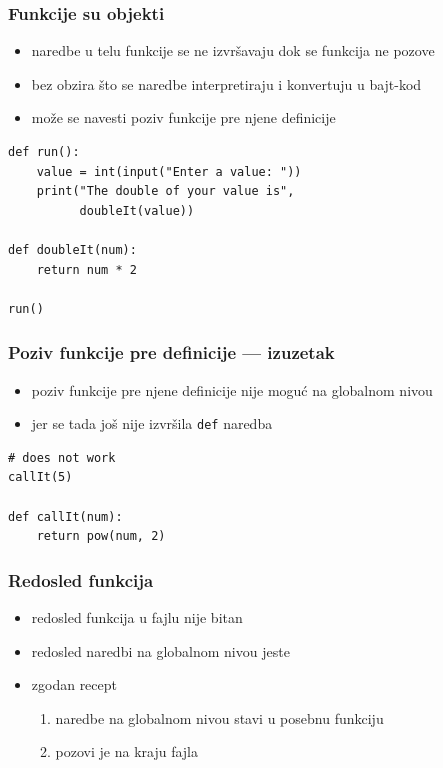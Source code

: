 \documentclass[compress]{beamer}
\begin{document}
\begin{frame}[fragile]
\frametitle{Funkcije su objekti}
\begin{itemize}
  \item naredbe u telu funkcije se ne izvršavaju dok se funkcija ne pozove
  \item bez obzira što se naredbe interpretiraju i konvertuju u bajt-kod
  \item može se navesti poziv funkcije pre njene definicije
\end{itemize}
\begin{verbatim}
def run():
    value = int(input("Enter a value: "))
    print("The double of your value is",
          doubleIt(value))

def doubleIt(num):
    return num * 2

run()
\end{verbatim}
\end{frame}

\begin{frame}[fragile]
\frametitle{Poziv funkcije pre definicije --- izuzetak}
\begin{itemize}
  \item poziv funkcije pre njene definicije nije moguć na globalnom nivou
  \item jer se tada još nije izvršila \texttt{def} naredba
\end{itemize}
\begin{verbatim}
# does not work
callIt(5)

def callIt(num):
    return pow(num, 2)
\end{verbatim}
\end{frame}

\begin{frame}[fragile]
\frametitle{Redosled funkcija}
\begin{itemize}
  \item redosled funkcija u fajlu nije bitan
  \item redosled naredbi na globalnom nivou jeste
  \item zgodan recept
  \begin{enumerate}
    \item naredbe na globalnom nivou stavi u posebnu funkciju
    \item pozovi je na kraju fajla
  \end{enumerate}
\end{itemize}
\end{frame}
\end{document}
